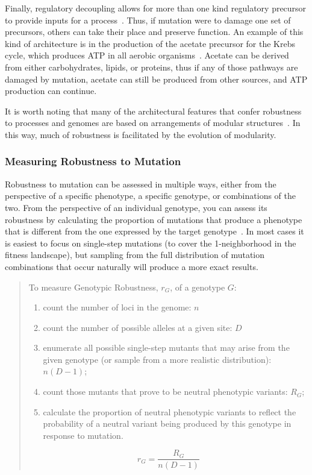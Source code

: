 \documentclass[PhD]{msu-thesis}
\begin{document}
Finally, regulatory decoupling allows for more than one kind regulatory precursor to provide inputs for a process~\cite{wagner_distributed_2005}. Thus, if mutation were to damage one set of precursors, others can take their place and preserve function. An example of this kind of architecture is in the production of the acetate precursor for the Krebs cycle, which produces ATP in all aerobic organisms~\cite{baldwin_evolution_1981}. Acetate can be derived from either carbohydrates, lipids, or proteins, thus if any of those pathways are damaged by mutation, acetate can still be produced from other sources, and ATP production can continue.

It is worth noting that many of the architectural features that confer robustness to processes and genomes are based on arrangements of modular structures~\cite{stelling_robustness_2004,wagner_road_2007}. In this way, much of robustness is facilitated by the evolution of modularity.



\subsubsection{Measuring Robustness to Mutation}
Robustness to mutation can be assessed in multiple ways, either from the perspective of a specific phenotype, a specific genotype, or combinations of the two. From the perspective of an individual genotype, you can assess its robustness by calculating the proportion of mutations that produce a phenotype that is different from the one expressed by the target genotype~\cite{andreas_wagner_robustness_2008}. In most cases it is easiest to focus on single-step mutations (to cover the 1-neighborhood in the fitness landscape), but sampling from the full distribution of mutation combinations that occur naturally will produce a more exact results.

	\begin{quote}
	To measure Genotypic Robustness, $r_G$, of a genotype $G$:

	\begin{enumerate}
	\item count the number of loci in the genome: $n$
	\item count the number of possible alleles at a given site: $D$ 
	\item enumerate all possible single-step mutants that may arise from the given genotype (or sample from a more realistic distribution): $n(D-1)$;
	\item count those mutants that prove to be neutral phenotypic variants: $R_G$;
	\item calculate the proportion of neutral phenotypic variants to reflect the probability of a neutral variant being produced by this genotype in response to mutation. 
	\end{enumerate}
	\begin{equation}
	r_{G} = \frac{R_{G}}{n(D-1)}
	\end{equation} 
	\end{quote}
\end{document}
